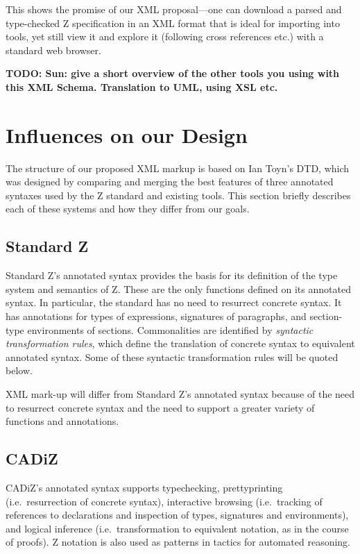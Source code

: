 \documentclass{llncs}  %
\newcommand{\CADiZ}{CADiZ}
\newcommand{\TODO}[1]{\textbf{TODO: #1}}   %
\begin{document}
This shows the promise of our XML proposal---one can download a parsed
and type-checked Z specification in an XML format that is ideal for
importing into tools, yet still view it and explore it (following
cross references etc.) with a standard web browser.


  \TODO{Sun: give a short overview of the other tools you using with
        this XML Schema.  Translation to UML, using XSL etc.}


\section{Influences on our Design}

The structure of our proposed XML markup is based on Ian Toyn's DTD,
which was designed by comparing and merging the best features
of three annotated syntaxes used by the Z standard and existing tools.
This section briefly describes each of these systems and how they
differ from our goals.

\subsection{Standard Z}

Standard Z's annotated syntax provides the basis for its definition
of the type system and semantics of Z.
These are the only functions defined on its annotated syntax.
In particular, the standard has no need to resurrect concrete syntax.
It has annotations for types of expressions,
signatures of paragraphs, and section-type environments of sections.
Commonalities are identified by \textit{syntactic transformation rules},
which define the translation of concrete syntax to equivalent annotated syntax.
Some of these syntactic transformation rules will be quoted below.

XML mark-up will differ from Standard Z's annotated syntax
because of the need to resurrect concrete syntax
and the need to support a greater variety of functions and annotations.

\subsection{\CADiZ}

\CADiZ's annotated syntax supports typechecking,
prettyprinting (i.e.\ resurrection of concrete syntax),
interactive browsing (i.e.\ tracking of references to declarations
and inspection of types, signatures and environments),
and logical inference (i.e.\ transformation to equivalent notation,
as in the course of proofs).
Z notation is also used as patterns in tactics for automated reasoning.
\end{document}
